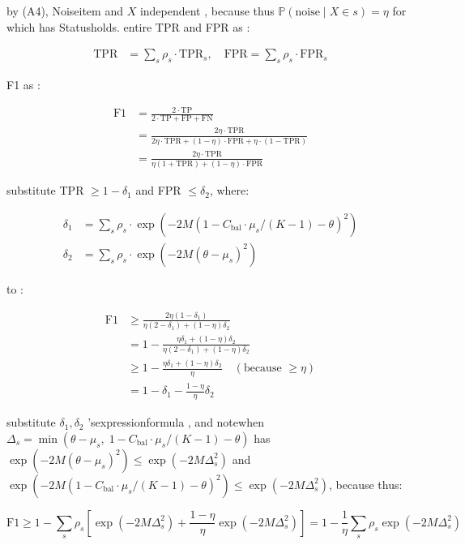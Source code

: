 \documentclass[
  12pt,
]{article}
\begin{document}
by  (A4), Noiseitem and  \(X\) independent , because thus
\(\mathbb{P}(\text{noise} \mid X \in s) = \eta\) for which has Statusholds. entire
TPR and  FPR as : 

\[\begin{aligned}
\text{TPR} &= \sum_s \rho_s \cdot \text{TPR}_s, \quad
\text{FPR} = \sum_s \rho_s \cdot \text{FPR}_s
\end{aligned}\]

F1 as : 

\[\begin{aligned}
\text{F1} &= \frac{2 \cdot \text{TP} }{2 \cdot \text{TP} + \text{FP} + \text{FN}} \\
&= \frac{2\eta \cdot \text{TPR}}{2\eta \cdot \text{TPR} + (1-\eta) \cdot \text{FPR} + \eta \cdot (1 - \text{TPR})} \\
&= \frac{2\eta \cdot \text{TPR}}{\eta(1 + \text{TPR}) + (1-\eta) \cdot \text{FPR}}
\end{aligned}\]

substitute TPR \(\geq 1 - \delta_1\) and  FPR \(\leq \delta_2\), where: 

\[\begin{aligned}
\delta_1 &= \sum_s \rho_s \cdot \exp(-2M(1 - C_{\text{bal}} \cdot \mu_s/(K-1) - \theta)^2) \\
\delta_2 &= \sum_s \rho_s \cdot \exp(-2M(\theta - \mu_s)^2)
\end{aligned}\]

to : 

\[\begin{aligned}
\text{F1} &\geq \frac{2\eta(1 - \delta_1)}{\eta(2 - \delta_1) + (1-\eta)\delta_2} \\
&= 1 - \frac{\eta\delta_1 + (1-\eta)\delta_2}{\eta(2 - \delta_1) + (1-\eta)\delta_2} \\
&\geq 1 - \frac{\eta\delta_1 + (1-\eta)\delta_2}{\eta} \quad (\text{because  } \geq \eta) \\
&= 1 - \delta_1 - \frac{1-\eta}{\eta}\delta_2
\end{aligned}\]

substitute \(\delta_1, \delta_2\) 'sexpressionformula , and notewhen 
\(\Delta_s = \min(\theta - \mu_s, \; 1 - C_{\text{bal}} \cdot \mu_s/(K-1) - \theta)\)
has  \(\exp(-2M(\theta - \mu_s)^2) \leq \exp(-2M\Delta_s^2)\) and 
\(\exp(-2M(1 - C_{\text{bal}} \cdot \mu_s/(K-1) - \theta)^2) \leq \exp(-2M\Delta_s^2)\), because thus: 

\[ \text{F1} \geq 1 - \sum_s \rho_s \left[\exp(-2M\Delta_s^2) + \frac{1-\eta}{\eta}\exp(-2M\Delta_s^2)\right] = 1 - \frac{1}{\eta}\sum_s \rho_s \exp(-2M\Delta_s^2) \]
\end{document}
